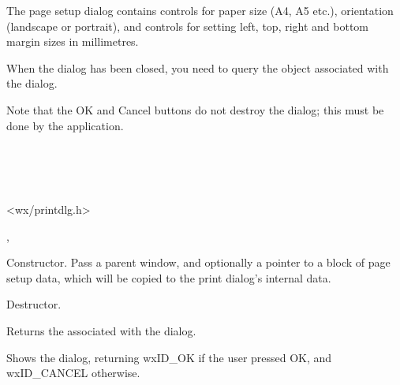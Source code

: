 The page setup dialog contains controls for paper size (A4, A5 etc.), orientation (landscape
or portrait), and controls for setting left, top, right and bottom margin sizes in millimetres.

When the dialog has been closed, you need to query the  object
associated with the dialog.

Note that the OK and Cancel buttons do not destroy the dialog; this must be done by the
application.


\\
\\
\\


<wx/printdlg.h>


, 




Constructor. Pass a parent window, and optionally a pointer to a block of page setup
data, which will be copied to the print dialog's internal data.



Destructor.

\label{wxpagesetupdialoggetpagesetupdata}


Returns the  associated with the dialog.

\label{wxpagesetupdialogshowmodal}


Shows the dialog, returning wxID\_OK if the user pressed OK, and wxID\_CANCEL
otherwise.

